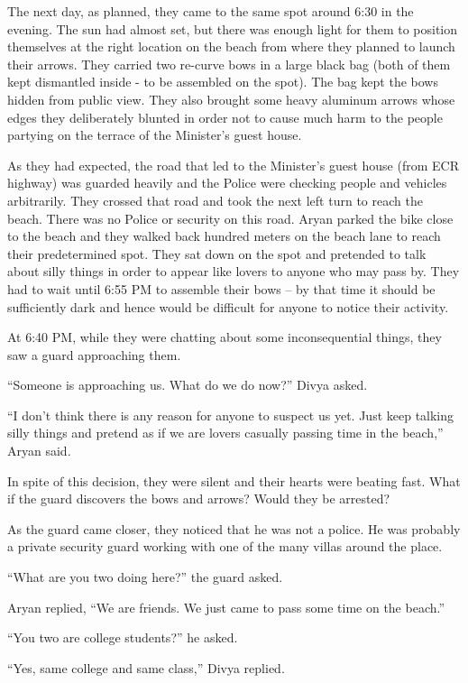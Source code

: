 The next day, as planned, they came to the same spot around 6:30 in the evening.
The sun had almost set, but there was enough light for them to position
themselves at the right location on the beach from where they planned to launch
their arrows. They carried two re-curve bows in a large black bag (both of them
kept dismantled inside - to be assembled on the spot). The bag kept the bows
hidden from public view. They also brought some heavy aluminum arrows whose
edges they deliberately blunted in order not to cause much harm to the people
partying on the terrace of the Minister's guest house.

As they had expected, the road that led to the Minister's guest house (from ECR
highway) was guarded heavily and the Police were checking people and vehicles
arbitrarily. They crossed that road and took the next left turn to reach the
beach. There was no Police or security on this road. Aryan parked the bike close
to the beach and they walked back hundred meters on the beach lane to reach
their predetermined spot. They sat down on the spot and pretended to talk about
silly things in order to appear like lovers to anyone who may pass by. They had
to wait until 6:55 PM to assemble their bows – by that time it should be
sufficiently dark and hence would be difficult for anyone to notice their
activity.

At 6:40 PM, while they were chatting about some inconsequential things, they saw
a guard approaching them.

“Someone is approaching us. What do we do now?” Divya asked.

“I don't think there is any reason for anyone to suspect us yet. Just keep
talking silly things and pretend as if we are lovers casually passing time in
the beach,” Aryan said.

In spite of this decision, they were silent and their hearts were beating fast.
What if the guard discovers the bows and arrows? Would they be arrested?

As the guard came closer, they noticed that he was not a police. He was probably
a private security guard working with one of the many villas around the place.

“What are you two doing here?” the guard asked.

Aryan replied, “We are friends. We just came to pass some time on the beach.”

“You two are college students?” he asked.

“Yes, same college and same class,” Divya replied.

